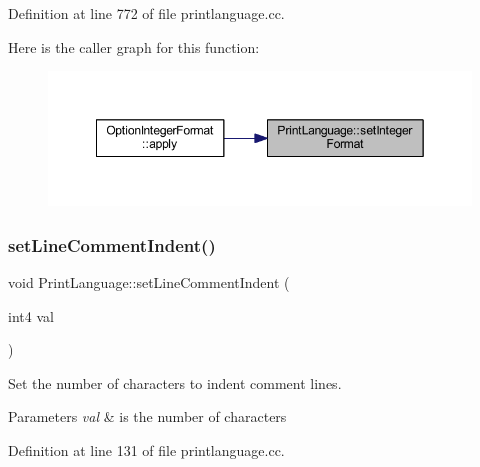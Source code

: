 Definition at line 772 of file printlanguage.\+cc.

Here is the caller graph for this function\+:
\nopagebreak
\begin{figure}[H]
\begin{center}
\leavevmode
\includegraphics[width=349pt]{class_print_language_af001882863a1a4a2abefd75e8db5e593_icgraph}
\end{center}
\end{figure}
\mbox{\label{class_print_language_a3fff2b3ce27f87722011688cd3ba19d6}} 
\subsubsection{\texorpdfstring{setLineCommentIndent()}{setLineCommentIndent()}}
{\footnotesize\ttfamily void Print\+Language\+::set\+Line\+Comment\+Indent (\begin{DoxyParamCaption}\item[{int4}]{val }\end{DoxyParamCaption})}



Set the number of characters to indent comment lines. 


\begin{DoxyParams}{Parameters}
{\em val} & is the number of characters \\
\hline
\end{DoxyParams}


Definition at line 131 of file printlanguage.\+cc.

